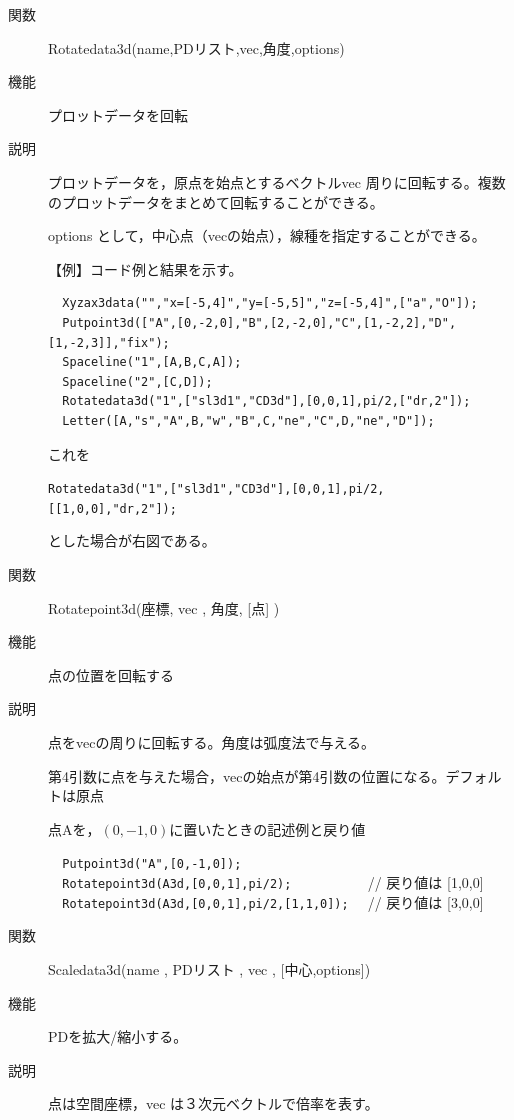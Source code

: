 \documentclass[papersize,a4paper,12pt,uplatex]{jsarticle}
\begin{document}
\begin{description}
    
\vspace{\baselineskip}
\hypertarget{rotatedata3d}{}
\item[関数]  Rotatedata3d(name,PDリスト,vec,角度,options)
\item[機能]  プロットデータを回転
\item[説明]  プロットデータを，原点を始点とするベクトルvec 周りに回転する。複数のプロットデータをまとめて回転することができる。

options として，中心点（vecの始点），線種を指定することができる。

\vspace{\baselineskip}
【例】コード例と結果を示す。
\begin{verbatim}
  Xyzax3data("","x=[-5,4]","y=[-5,5]","z=[-5,4]",["a","O"]);
  Putpoint3d(["A",[0,-2,0],"B",[2,-2,0],"C",[1,-2,2],"D",[1,-2,3]],"fix");
  Spaceline("1",[A,B,C,A]);
  Spaceline("2",[C,D]);
  Rotatedata3d("1",["sl3d1","CD3d"],[0,0,1],pi/2,["dr,2"]);
  Letter([A,"s","A",B,"w","B",C,"ne","C",D,"ne","D"]);
\end{verbatim}
これを

  \verb|Rotatedata3d("1",["sl3d1","CD3d"],[0,0,1],pi/2,[[1,0,0],"dr,2"]);|
  
とした場合が右図である。

  \hspace{5mm}  

\vspace{\baselineskip}
\hypertarget{rotatepoint3d}{}
\item[関数]  Rotatepoint3d(座標, vec , 角度, [点] )
\item[機能]  点の位置を回転する
\item[説明]  点をvecの周りに回転する。角度は弧度法で与える。

第4引数に点を与えた場合，vecの始点が第4引数の位置になる。デフォルトは原点

点Aを，$(0,-1,0)$に置いたときの記述例と戻り値
 
\verb|  Putpoint3d("A",[0,-1,0]);| \\
\verb|  Rotatepoint3d(A3d,[0,0,1],pi/2);          |  // 戻り値は [1,0,0]\\
\verb|  Rotatepoint3d(A3d,[0,0,1],pi/2,[1,1,0]);  | // 戻り値は [3,0,0]\\
 
\vspace{\baselineskip}
\hypertarget{scaledata3d}{}
\item[関数]  Scaledata3d(name , PDリスト , vec , [中心,options])
\item[機能]  PDを拡大/縮小する。
\item[説明]  点は空間座標，vec は３次元ベクトルで倍率を表す。


\end{description}
\end{document}
